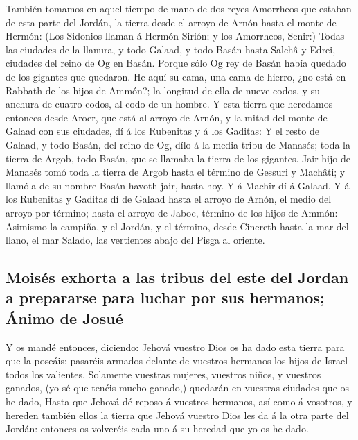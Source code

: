  También tomamos en aquel tiempo de mano de dos reyes
Amorrheos que estaban de esta parte del Jordán, la tierra desde el
arroyo de Arnón hasta el monte de Hermón:  (Los Sidonios
llaman á Hermón Sirión; y los Amorrheos, Senir:)  Todas
las ciudades de la llanura, y todo Galaad, y todo Basán hasta Salchâ y
Edrei, ciudades del reino de Og en Basán.  Porque sólo Og
rey de Basán había quedado de los gigantes que quedaron. He aquí su
cama, una cama de hierro, ¿no está en Rabbath de los hijos de Ammón?; la
longitud de ella de nueve codos, y su anchura de cuatro codos, al codo
de un hombre.  Y esta tierra que heredamos entonces desde
Aroer, que está al arroyo de Arnón, y la mitad del monte de Galaad con
sus ciudades, dí á los Rubenitas y á los Gaditas:  Y el
resto de Galaad, y todo Basán, del reino de Og, dílo á la media tribu de
Manasés; toda la tierra de Argob, todo Basán, que se llamaba la tierra
de los gigantes.  Jair hijo de Manasés tomó toda la
tierra de Argob hasta el término de Gessuri y Machâti; y llamóla de su
nombre Basán-havoth-jair, hasta hoy.  Y á Machîr dí á
Galaad.  Y á los Rubenitas y Gaditas dí de Galaad hasta
el arroyo de Arnón, el medio del arroyo por término; hasta el arroyo de
Jaboc, término de los hijos de Ammón:  Asimismo la
campiña, y el Jordán, y el término, desde Cinereth hasta la mar del
llano, el mar Salado, las vertientes abajo del Pisga al oriente.

\hypertarget{moisuxe9s-exhorta-a-las-tribus-del-este-del-jordan-a-prepararse-para-luchar-por-sus-hermanos-uxe1nimo-de-josuuxe9}{%
\subsection{Moisés exhorta a las tribus del este del Jordan a prepararse
para luchar por sus hermanos; Ánimo de
Josué}\label{moisuxe9s-exhorta-a-las-tribus-del-este-del-jordan-a-prepararse-para-luchar-por-sus-hermanos-uxe1nimo-de-josuuxe9}}

 Y os mandé entonces, diciendo: Jehová vuestro Dios os ha
dado esta tierra para que la poseáis: pasaréis armados delante de
vuestros hermanos los hijos de Israel todos los valientes.
 Solamente vuestras mujeres, vuestros niños, y vuestros
ganados, (yo sé que tenéis mucho ganado,) quedarán en vuestras ciudades
que os he dado,  Hasta que Jehová dé reposo á vuestros
hermanos, así como á vosotros, y hereden también ellos la tierra que
Jehová vuestro Dios les da á la otra parte del Jordán: entonces os
volveréis cada uno á su heredad que yo os he dado.


